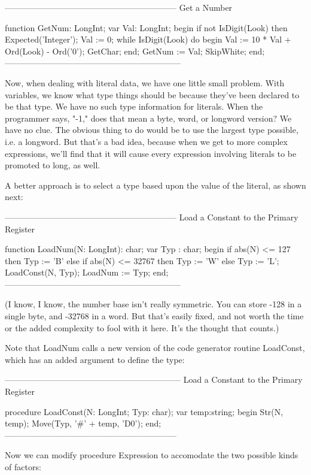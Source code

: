 \documentclass[float=false, crop=false]{standalone}
\begin{document}
{--------------------------------------------------------------}
{ Get a Number }

function GetNum: LongInt;
var Val: LongInt;
begin
   if not IsDigit(Look) then Expected('Integer');
   Val := 0;
   while IsDigit(Look) do begin
      Val := 10 * Val + Ord(Look) - Ord('0');
      GetChar;
   end;
   GetNum := Val;
   SkipWhite;
end;
{---------------------------------------------------------------}


Now, when dealing with literal data, we have one little small problem. With
variables, we know what type things should be because they've been declared to
be that type. We have no such type information for literals. When the programmer
says, "-1," does that mean a byte, word, or longword version? We have no clue.
The obvious thing to do would be to use the largest type possible, i.e. a
longword. But that's a bad idea, because when we get to more complex
expressions, we'll find that it will cause every expression involving literals
to be promoted to long, as well.

A better approach is to select a type based upon the value of the literal, as
shown next:


{--------------------------------------------------------------}
{ Load a Constant to the Primary Register }

function LoadNum(N: LongInt): char;
var Typ : char;
begin
   if abs(N) <= 127 then
      Typ := 'B'
   else if abs(N) <= 32767 then
      Typ := 'W'
   else Typ := 'L';
   LoadConst(N, Typ);
   LoadNum := Typ;
end;
{---------------------------------------------------------------}


(I know, I know, the number base isn't really symmetric. You can store -128 in a
single byte, and -32768 in a word. But that's easily fixed, and not worth the
time or the added complexity to fool with it here. It's the thought that
counts.)

Note that LoadNum calls a new version of the code generator routine LoadConst,
which has an added argument to define the type:


{---------------------------------------------------------------}
{ Load a Constant to the Primary Register }

procedure LoadConst(N: LongInt; Typ: char);
var temp:string;
begin
   Str(N, temp);
   Move(Typ, '#' + temp, 'D0');
end;
{--------------------------------------------------------------}


Now we can modify procedure Expression to accomodate the two possible kinds of
factors:
\end{document}
